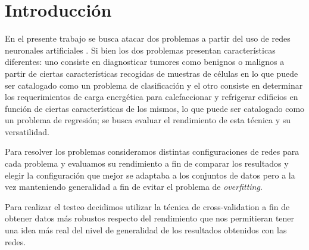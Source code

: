 \documentclass[informe.tex]{subfiles}
\begin{document}
  
  \section{Introducción}

  En el presente trabajo se busca atacar dos problemas a partir del uso de redes neuronales artificiales \cite{hertz}. Si bien los dos problemas presentan características diferentes: uno consiste en diagnosticar tumores como benignos o malignos a partir de ciertas características recogidas de muestras de células en lo que puede ser catalogado como un problema de clasificación y el otro consiste en determinar los requerimientos de carga energética para calefaccionar y refrigerar edificios en función de ciertas características de los mismos, lo que puede ser catalogado como un problema de regresión; se busca evaluar el rendimiento de esta técnica y su versatilidad.
  
  Para resolver los problemas consideramos distintas configuraciones de redes para cada problema y evaluamos su rendimiento a fin de comparar los resultados y elegir la configuración que mejor se adaptaba a los conjuntos de datos pero a la vez manteniendo generalidad a fin de evitar el problema de \emph{overfitting}.
  
  Para realizar el testeo decidimos utilizar la técnica de cross-validation \cite{haykin} a fin de obtener datos más robustos respecto del rendimiento que nos permitieran tener una idea más real del nivel de generalidad de los resultados obtenidos con las redes.
  
\end{document}
